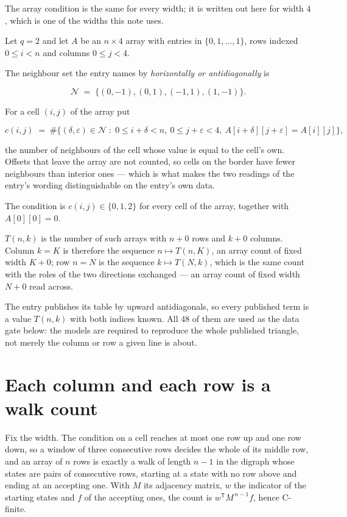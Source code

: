 \documentclass[11pt]{article}
\theoremstyle{definition}
\begin{document}
The array condition is the same for every width; it is written out here for width $4$, which is one of the widths this note uses.

Let $q = 2$ and let $A$ be an $n \times 4$ array with entries in $\{0,1,\dots,1\}$, rows indexed $0 \le i < n$ and columns $0 \le j < 4$.

The neighbour set the entry names by {\itshape horizontally or antidiagonally} is

\[\mathcal{N} \;=\; \{(0,-1), (0,1), (-1,1), (1,-1)\}.\]

For a cell $(i,j)$ of the array put

\[c(i,j) \;=\; \#\bigl\{(\delta,\varepsilon)\in\mathcal{N} \;:\; 0\le i+\delta<n,\ 0\le j+\varepsilon<4,\ A[i+\delta][j+\varepsilon] = A[i][j]\bigr\},\]

the number of neighbours of the cell whose value is equal to the cell's own. Offsets that leave the array are not counted, so cells on the border have fewer neighbours than interior ones --- which is what makes the two readings of the entry's wording distinguishable on the entry's own data.

The condition is $c(i,j) \in \{0, 1, 2\}$ for every cell of the array, together with $A[0][0]=0$.

$T(n,k)$ is the number of such arrays with $n + 0$ rows and $k + 0$ columns. Column $k = K$ is therefore the sequence $n \mapsto T(n,K)$, an array count of fixed width $K + 0$; row $n = N$ is the sequence $k \mapsto T(N,k)$, which is the same count with the roles of the two directions exchanged --- an array count of fixed width $N + 0$ read across.

The entry publishes its table by upward antidiagonals, so every published term is a value $T(n,k)$ with both indices known. All 48 of them are used as the data gate below: the models are required to reproduce the whole published triangle, not merely the column or row a given line is about.

\section{Each column and each row is a walk count}

Fix the width. The condition on a cell reaches at most one row up and one row down, so a window of three consecutive rows decides the whole of its middle row, and an array of $n$ rows is exactly a walk of length $n-1$ in the digraph whose states are pairs of consecutive rows, starting at a state with no row above and ending at an accepting one. With $M$ its adjacency matrix, $w$ the indicator of the starting states and $f$ of the accepting ones, the count is $w^{\mathsf T}M^{\,n-1}f$, hence C-finite.
\end{document}
